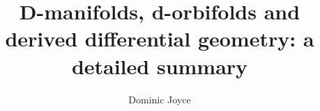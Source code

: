 \documentclass{article}
\begin{document}
\def\pd{\partial}
\def\ts{\textstyle}
\def\st{\scriptstyle}
\def\sst{\scriptscriptstyle}
\def\w{\wedge}
\def\sm{\setminus}
\def\lt{\ltimes}
\def\bu{\bullet}
\def\sh{\sharp}
\def\op{\oplus}
\def\od{\odot}
\def\op{\oplus}
\def\ot{\otimes}
\def\ov{\overline}
\def\bigop{\bigoplus}
\def\bigot{\bigotimes}
\def\iy{\infty}
\def\es{\emptyset}
\def\ra{\rightarrow}
\def\rra{\rightrightarrows}
\def\Ra{\Rightarrow}
\def\Longra{\Longrightarrow}
\def\ab{\allowbreak}
\def\longra{\longrightarrow}
\def\hookra{\hookrightarrow}
\def\dashra{\dashrightarrow}
\def\t{\times}
\def\ci{\circ}
\def\ti{\tilde}
\def\d{{\rm d}}
\def\md#1{\vert #1 \vert}
\def\bmd#1{\big\vert #1 \big\vert}
\def\an#1{\langle #1 \rangle}
\title{D-manifolds, d-orbifolds and derived differential geometry:
a detailed summary}
\author{Dominic Joyce}
\date{}
\maketitle
\end{document}

